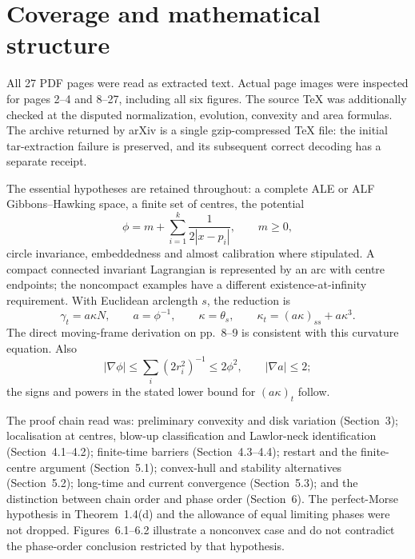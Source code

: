 \documentclass[10pt]{article}
\begin{document}
\section*{Coverage and mathematical structure}
All 27 PDF pages were read as extracted text. Actual page images were inspected for pages 2–4 and 8–27, including all six figures. The source TeX was additionally checked at the disputed normalization, evolution, convexity and area formulas. The archive returned by arXiv is a single gzip-compressed TeX file: the initial tar-extraction failure is preserved, and its subsequent correct decoding has a separate receipt.\par
The essential hypotheses are retained throughout: a complete ALE or ALF Gibbons–Hawking space, a finite set of centres, the potential \[\phi=m+\sum_{i=1}^k\frac1{2|x-p_i|},\qquad m\geq0,\] circle invariance, embeddedness and almost calibration where stipulated. A compact connected invariant Lagrangian is represented by an arc with centre endpoints; the noncompact examples have a different existence-at-infinity requirement. With Euclidean arclength \(s\), the reduction is \[\gamma_t=a\kappa N,\qquad a=\phi^{-1},\qquad \kappa=\theta_s,\qquad
 \kappa_t=(a\kappa)_{ss}+a\kappa^3.\] The direct moving-frame derivation on pp. 8–9 is consistent with this curvature equation. Also \[|\nabla\phi|\leq\sum_i(2r_i^2)^{-1}\leq2\phi^2,\qquad |\nabla a|\leq2;\] the signs and powers in the stated lower bound for \((a\kappa)_t\) follow.\par
The proof chain read was: preliminary convexity and disk variation (Section 3); localisation at centres, blow-up classification and Lawlor-neck identification (Section 4.1–4.2); finite-time barriers (Section 4.3–4.4); restart and the finite-centre argument (Section 5.1); convex-hull and stability alternatives (Section 5.2); long-time and current convergence (Section 5.3); and the distinction between chain order and phase order (Section 6). The perfect-Morse hypothesis in Theorem 1.4(d) and the allowance of equal limiting phases were not dropped. Figures 6.1–6.2 illustrate a nonconvex case and do not contradict the phase-order conclusion restricted by that hypothesis.\par
\end{document}
